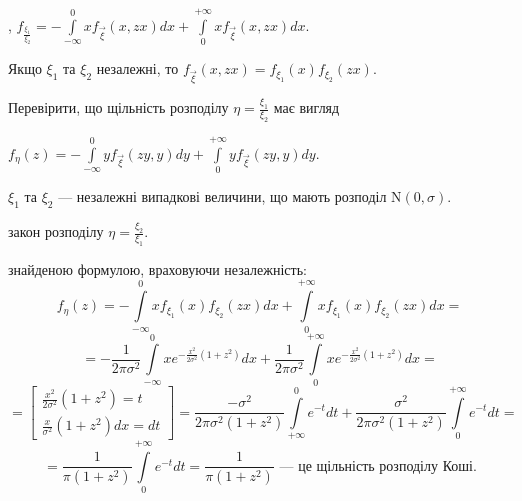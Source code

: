 , $f_{\frac{\xi_1}{\xi_2}} = -\int\limits_{-\infty}^0 xf_{\vec{\xi}}(x, zx)dx + 
\int\limits_0^{+\infty}xf_{\vec{\xi}}(x, zx)dx$.

\begin{remark}
    Якщо $\xi_1$ та $\xi_2$ незалежні, то $f_{\vec{\xi}}(x, zx) = 
    f_{\xi_1}(x)f_{\xi_2}(zx)$.
\end{remark}

\begin{exercise}
    Перевірити, що щільність розподілу $\eta = \frac{\xi_1}{\xi_2}$ має вигляд

    \noindent$f_\eta(z) = -\int\limits_{-\infty}^0 y f_{\vec {\xi}}(zy, y) dy + \int\limits_0^{+\infty}
    yf_{\vec{\xi}}(zy, y)dy$.
\end{exercise}

\begin{example}
    $\xi_1$ та $\xi_2$ --- незалежні випадкові величини, що мають розподіл $\mathrm{N}(0, \sigma)$.
    
     закон розподілу $\eta = \frac{\xi_2}{\xi_1}$.

     знайденою формулою, враховуючи незалежність:
    \begin{equation*}
        f_\eta(z) = - \int\limits_{-\infty}^0 x f_{\xi_1}(x) f_{\xi_2}(zx) dx + 
        \int\limits_{0}^{+\infty} x f_{\xi_1}(x) f_{\xi_2}(zx) dx = 
    \end{equation*}
    \begin{equation*}
        =
        -\frac{1}{2\pi\sigma^2}\int\limits_{-\infty}^0 x e^{-\frac{x^2}{2\sigma^2}(1+z^2)} dx
        +
        \frac{1}{2\pi\sigma^2}\int\limits_0^{+\infty} x e^{-\frac{x^2}{2\sigma^2}(1+z^2)}dx = 
    \end{equation*}
    \begin{equation*}
        = \left[
        \begin{array}{c}
            \frac{x^2}{2\sigma^2}(1+z^2) = t \\
            \frac{x}{\sigma^2}(1+z^2)dx = dt 
        \end{array}
        \right]
        =
        \frac{-\sigma^2}{2\pi\sigma^2(1+z^2)}\int\limits_{+\infty}^0 e^{-t} dt
        +
        \frac{\sigma^2}{2\pi\sigma^2(1+z^2)}\int\limits^{+\infty}_0 e^{-t} dt = 
    \end{equation*}
    \begin{equation*}
        = \frac{1}{\pi(1+z^2)}\int\limits_0^{+\infty}e^{-t}dt = \frac{1}{\pi(1+z^2)}
        \text{ --- це щільність розподілу Коші.}
    \end{equation*}
\end{example}

